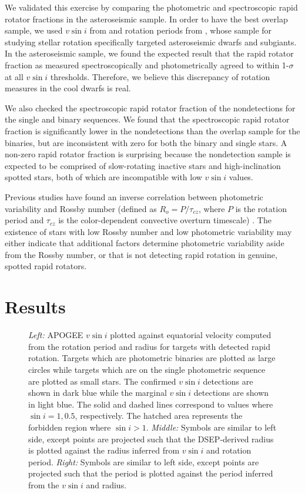 \documentclass[manuscript]{aastex6}
\newcommand{\vsini}{\ensuremath{v \sin i}}
\begin{document}
We validated this exercise by comparing the photometric and spectroscopic
rapid rotator fractions in the asteroseismic sample. In order to have the best
overlap sample, we used \vsini{} from \citet{Bruntt12} and rotation periods
from \citet{Garcia14}, whose sample for studying stellar rotation specifically
targeted asteroseismic dwarfs and subgiants. In the asteroseismic
sample, we found the expected result that the rapid rotator
fraction as measured spectroscopically and photometrically agreed to within
1-\(\sigma\) at all \vsini{} thresholds. Therefore, we believe this
discrepancy of rotation measures in the cool dwarfs is real.

We also checked the spectroscopic rapid rotator fraction of the 
\citet{McQuillan14} nondetections for the single and binary sequences. We 
found that the spectroscopic rapid rotator fraction is significantly
lower in the nondetections than the overlap sample for the binaries, but are 
inconsistent with zero for both the binary and single stars. 
A non-zero rapid rotator fraction is surprising because the nondetection
sample is expected to be comprised of slow-rotating inactive stars and 
high-inclination spotted stars, both of which are incompatible with low 
\vsini{} values. 

Previous studies have found an inverse correlation between 
photometric variability and Rossby number (defined as \(R_o = P / \tau_{cz}\), where \(P\)
    is the rotation period and \(\tau_{cz}\) is the color-dependent 
convective overturn timescale) \citep{Messina01,Hartman09}. The existence of 
stars with low Rossby number and low photometric variability may either 
indicate that additional factors determine photometric variability 
aside from the Rossby number, or that \citet{McQuillan14} is not detecting 
rapid rotation in genuine, spotted rapid rotators.



\section{Results}
\label{sec:results}

\begin{figure*}
  \caption{\emph{Left:} APOGEE \vsini{} plotted against equatorial
  velocity computed from the rotation period and radius for targets with
  detected rapid rotation. Targets which are photometric binaries are plotted
  as large circles while targets which are on the single photometric sequence
  are plotted as small stars. The confirmed \vsini{} detections are shown
  in dark blue while the marginal \vsini{} detections are shown in light
  blue. The solid and dashed lines correspond to values where \(\sin i =
  1, 0.5\), respectively. The hatched area represents the forbidden
  region where \(\sin i > 1\). \emph{Middle:} Symbols are similar to left
  side, except points are projected such that the DSEP-derived radius is
  plotted against the radius inferred from \vsini{} and rotation
  period. \emph{Right:} Symbols are similar to left side, except points are
  projected such that the \citet{McQuillan14} period is plotted against the
  period inferred from the \vsini{} and radius.\label{fig:rot}}
\end{figure*}
\end{document}
